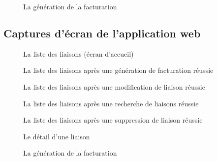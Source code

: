 \documentclass[a4paper,french,8pt]{article}
\begin{document}
		\begin{figure}[h!]
			\caption{La génération de la facturation}
			\centering
		\end{figure} 
			
		
		\newpage
		
		
		\subsection{Captures d'écran de l'application web}
		\newpage
		\begin{figure}[h!]
			\caption{La liste des liaisons (écran d'accueil)}
			\centering
		\end{figure} 
		
		\begin{figure}[h!]
			\caption{La liste des liaisons après une génération de facturation réussie}
			\centering
		\end{figure} 
		
		\begin{figure}[h!]
			\caption{La liste des liaisons après une modification de liaison réussie}
			\centering
		\end{figure} 
		
		\begin{figure}[h!]
			\caption{La liste des liaisons après une recherche de liaisons réussie}
			\centering
		\end{figure}
		
		\begin{figure}[h!]
			\caption{La liste des liaisons après une suppression de liaison réussie}
			\centering
		\end{figure} 

		\begin{figure}[h!]
			\caption{Le détail d'une liaison}
			\centering
		\end{figure}
			

		
		\begin{figure}[h!]
			\caption{La génération de la facturation}
			\centering
		\end{figure} 
		
\end{document}
